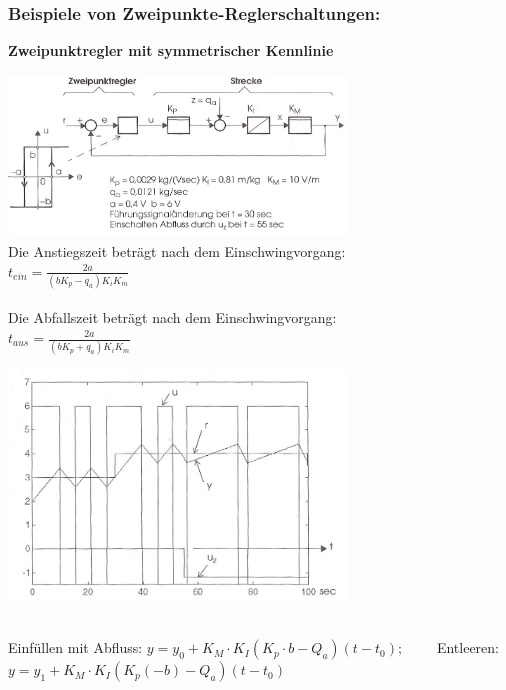	\subsubsection{Beispiele von Zweipunkte-Reglerschaltungen:}
		\textbf{Zweipunktregler mit symmetrischer Kennlinie } \\
		\begin{minipage}{9cm}
			\vspace{.5cm}        
	 		\includegraphics[width=9cm]{./bilder/Zweipunktregler-b+b2.jpg}\\
			Die Anstiegszeit beträgt nach dem Einschwingvorgang:\\
			$\boxed{t_{ein}=\frac{2a}{(b K_p - q_a)K_i K_m}}$ \\ \\
			Die Abfallszeit beträgt nach dem Einschwingvorgang:\\
			$\boxed{t_{aus}=\frac{2a}{(b K_p + q_a)K_i K_m}}$
        \end{minipage}
		\begin{minipage}{9cm}
			\vspace{.5cm}        
			\includegraphics[width=9cm]{./bilder/Zweipunktregler-b+b_dia.jpg}
        \end{minipage}\\
         Einfüllen mit Abfluss: $y = y_0 + K_M \cdot K_I(K_p \cdot b - Q_a)(t-t_0); \qquad$ 
         Entleeren: $y=y_1 + K_M \cdot K_I(K_p(-b) - Q_a)(t-t_0)$
    
